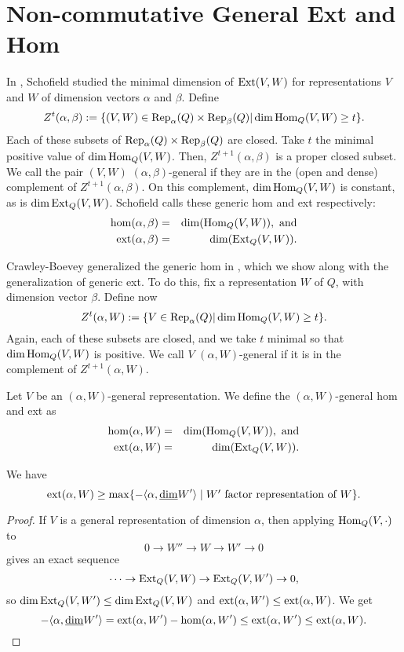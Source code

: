 \section{Non-commutative General Ext and Hom}

In \cite{Scho92}, Schofield studied the minimal dimension of $\operatorname{Ext}(V,W)$ for representations $V$ and $W$ of dimension vectors $\alpha$ and $\beta$. Define
$$Z^t(\alpha,\beta):=\{(V,W)\in \operatorname{Rep}_\alpha(Q)\times\operatorname{Rep}_\beta(Q)|\dim\operatorname{Hom}_Q(V,W)\geq t\}.$$
Each of these subsets of $\operatorname{Rep}_\alpha(Q)\times\operatorname{Rep}_\beta(Q)$ are closed. Take $t$ the minimal positive value of $\dim\operatorname{Hom}_Q(V,W)$. Then, $Z^{t+1}(\alpha,\beta)$ is a proper closed subset. We call the pair $(V,W)$ $(\alpha,\beta)$-general if they are in the (open and dense) complement of $Z^{t+1}(\alpha,\beta)$. On this complement, $\dim\operatorname{Hom}_Q(V,W)$ is constant, as is $\dim\operatorname{Ext}_Q(V,W)$. Schofield calls these generic hom and ext respectively:
\begin{eqnarray*}
\hom(\alpha,\beta)&=&\dim(\operatorname{Hom}_Q(V,W)), \text{ and}\\
\operatorname{ext}(\alpha,\beta)&=&\dim(\operatorname{Ext}_Q(V,W)).
\end{eqnarray*}

Crawley-Boevey generalized the generic hom in \cite{Craw96}, which we show along with the generalization of generic ext. To do this, fix a representation $W$ of $Q$, with dimension vector $\beta$. Define now 
$$Z^t(\alpha,W):=\{V\in \operatorname{Rep}_\alpha(Q)|\dim\operatorname{Hom}_Q(V,W)\geq t\}.$$
Again, each of these subsets are closed, and we take $t$ minimal so that $\dim\operatorname{Hom}_Q(V,W)$ is positive. We call $V$ $(\alpha,W)$-general if it is in the complement of $Z^{t+1}(\alpha,W)$.  

\begin{definition}
Let $V$ be an $(\alpha,W)$-general representation. We define the $(\alpha,W)$-general hom and ext as
\begin{eqnarray*}
\hom(\alpha,W)&=&\dim(\operatorname{Hom}_Q(V,W)), \text{ and}\\
\operatorname{ext}(\alpha,W)&=&\dim(\operatorname{Ext}_Q(V,W)).
\end{eqnarray*}
\end{definition}


\begin{lemma} We have 
$$
\operatorname{ext}(\alpha,W)\geq \max\{-\langle \alpha, \underline{\rm dim} W'\rangle \mid \mbox{$W'$ factor representation of $W$}\}.
$$
\end{lemma}
\begin{proof}
If $V$ is a general representation of dimension $\alpha$, then applying $\operatorname{Hom}_Q(V,\cdot)$ to 
$$0\to W''\to W\to W'\to 0$$
gives
an exact sequence
$$
\cdots\to \operatorname{Ext}_Q(V,W)\to \operatorname{Ext}_Q(V,W')\to 0,
$$
so $\dim \operatorname{Ext}_Q(V,W')\leq \dim \operatorname{Ext}_Q(V,W)$ and $\operatorname{ext}(\alpha,W')\leq \operatorname{ext}(\alpha,W)$.
We get
$$
-\langle \alpha,\underline{\rm dim} W'\rangle=\operatorname{ext}(\alpha,W')-\hom(\alpha,W')\leq \operatorname{ext}(\alpha,W')\leq \operatorname{ext}(\alpha,W).
$$
\end{proof}

